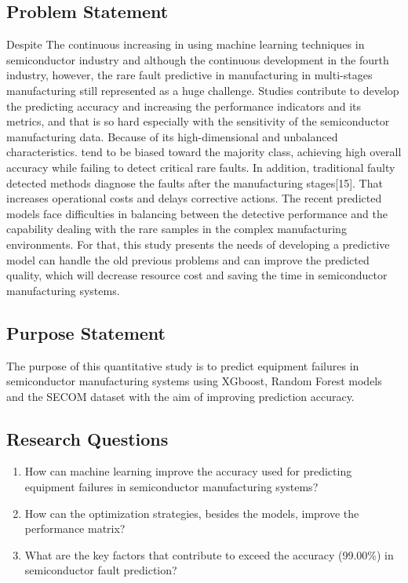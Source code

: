 \documentclass[12pt,oneside]{article}
\begin{document}
\subsection{Problem Statement}
Despite The continuous increasing in using machine learning techniques in semiconductor industry and although the continuous development in the fourth industry, however, the rare fault predictive in manufacturing in multi-stages manufacturing still represented as a huge challenge. Studies contribute to develop the predicting accuracy and increasing the performance indicators and its metrics, and that is so hard especially with the sensitivity of the semiconductor manufacturing data. Because of its high-dimensional and unbalanced characteristics. tend to be biased toward the majority class, achieving high overall accuracy while failing to detect critical rare faults.
In addition, traditional faulty detected methods diagnose the faults after the manufacturing stages[15]. That increases operational costs and delays corrective actions.  The recent predicted models face difficulties in balancing between the detective performance and the capability dealing with the rare samples in the complex manufacturing environments. For that, this study presents the needs of developing a predictive model can handle the old previous problems and can improve the predicted quality, which will decrease resource cost and saving the time in semiconductor manufacturing systems.


\subsection{Purpose Statement}
The purpose of this quantitative study is to predict equipment failures in semiconductor manufacturing systems using XGboost, Random Forest models and the SECOM dataset with the aim of improving prediction accuracy.



\subsection{Research Questions}
\begin{enumerate}[label=\textcolor{SteelBlue}{\arabic*.}]
    \item How can machine learning improve the accuracy used for predicting equipment failures in semiconductor manufacturing systems?
    \item How can the optimization strategies, besides the models, improve the performance matrix?
    \item What are the key factors that contribute to exceed the accuracy (99.00\%) in semiconductor fault prediction?
\end{enumerate}
\end{document}
